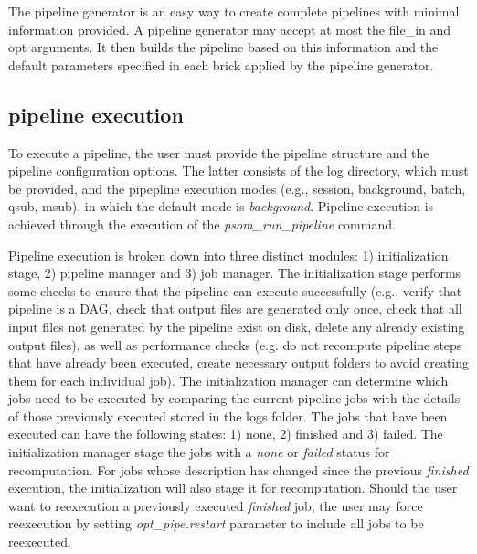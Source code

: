 \documentclass{report}
\begin{document}
        The pipeline generator is an easy way to create complete pipelines with
minimal information provided. A pipeline generator may accept at most the
file\_in and opt arguments. It then builds the pipeline based on this
information and the default parameters specified in each brick applied by the
pipeline generator.

        \subsection{pipeline execution}
        
        To execute a pipeline, the user must provide the pipeline structure and
the pipeline configuration options. The latter consists of the log
directory, which must be provided, and the pipepline execution modes (e.g., session, background, batch,
qsub, msub), in which the default mode is \textit{background}. Pipeline
execution is achieved through the execution of the \textit{psom\_run\_pipeline}
command. 

        Pipeline execution is broken down into three distinct modules: 1)
initialization stage, 2) pipeline manager and 3) job manager. The initialization
stage performs some checks to ensure that the pipeline can execute successfully
(e.g., verify that pipeline is a DAG, check that output files are generated only
once, check that all input files not generated by the pipeline exist on disk,
delete any already existing output files), as well as performance checks (e.g.
do not recompute pipeline steps that have already been executed, create
necessary output folders to avoid creating them for each individual job). The
initialization manager can determine which jobs need to be executed by comparing
the current pipeline jobs with the details of those previously executed stored
in the logs folder. The jobs that have been executed can have the following
states: 1) none, 2) finished and 3) failed. The initialization manager stage the jobs 
with a \textit{none} or \textit{failed} status for recomputation. For jobs whose
description has changed since the previous \textit{finished} execution, the
initialization will also stage it for recomputation. Should the user want to
reexecution a previously executed \textit{finished} job, the user may force
reexecution by setting \textit{opt\_pipe.restart} parameter to include all jobs
to be reexecuted.
\end{document}
